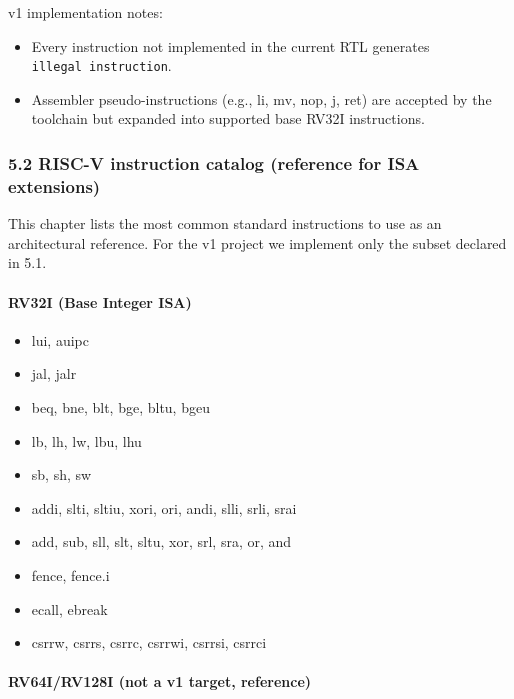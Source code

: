 \documentclass[]{article}
\providecommand{\tightlist}{%
  \setlength{\itemsep}{0pt}\setlength{\parskip}{0pt}}
\let\oldparagraph\paragraph
\renewcommand{\paragraph}[1]{\oldparagraph{#1}\mbox{}}
\begin{document}
v1 implementation notes:

\begin{itemize}
\tightlist
\item
  Every instruction not implemented in the current RTL generates
  \texttt{illegal\ instruction}.
\item
  Assembler pseudo-instructions (e.g., li, mv, nop, j, ret) are accepted
  by the toolchain but expanded into supported base RV32I instructions.
\end{itemize}

\hypertarget{52-risc-v-instruction-catalog-reference-for-isa-extensions}{%
\subsubsection{5.2 RISC-V instruction catalog (reference for ISA
extensions)}\label{52-risc-v-instruction-catalog-reference-for-isa-extensions}}

This chapter lists the most common standard instructions to use as an
architectural reference. For the v1 project we implement only the subset
declared in 5.1.

\hypertarget{rv32i-base-integer-isa}{%
\paragraph{RV32I (Base Integer ISA)}\label{rv32i-base-integer-isa}}

\begin{itemize}
\tightlist
\item
  lui, auipc
\item
  jal, jalr
\item
  beq, bne, blt, bge, bltu, bgeu
\item
  lb, lh, lw, lbu, lhu
\item
  sb, sh, sw
\item
  addi, slti, sltiu, xori, ori, andi, slli, srli, srai
\item
  add, sub, sll, slt, sltu, xor, srl, sra, or, and
\item
  fence, fence.i
\item
  ecall, ebreak
\item
  csrrw, csrrs, csrrc, csrrwi, csrrsi, csrrci
\end{itemize}

\hypertarget{rv64irv128i-not-a-v1-target-reference}{%
\paragraph{RV64I/RV128I (not a v1 target,
reference)}\label{rv64irv128i-not-a-v1-target-reference}}
\end{document}
